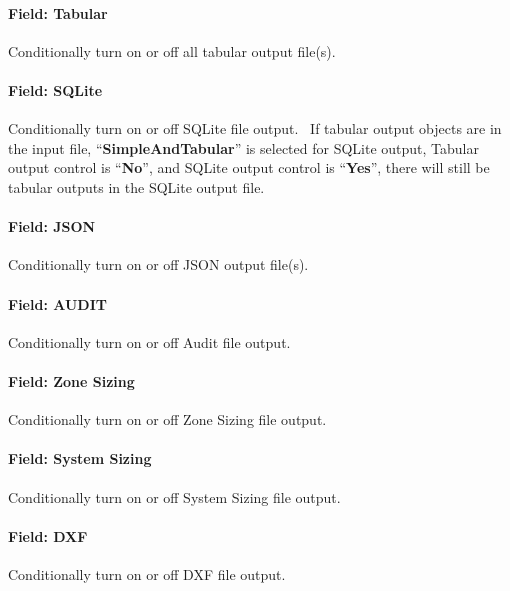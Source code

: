 \paragraph{Field: Tabular}\label{field-tabular}

Conditionally turn on or off all tabular output file(s).

\paragraph{Field: SQLite}\label{field-sqlite}

Conditionally turn on or off SQLite file output.~ If tabular output objects are in the input file, ``\textbf{SimpleAndTabular}'' is selected for SQLite output, Tabular output control is ``\textbf{No}'', and SQLite output control is ``\textbf{Yes}'', there will still be tabular outputs in the SQLite output file.

\paragraph{Field: JSON}\label{field-json}

Conditionally turn on or off JSON output file(s).

\paragraph{Field: AUDIT}\label{field-audit}

Conditionally turn on or off Audit file output.

\paragraph{Field: Zone Sizing}\label{field-zone-sizing}

Conditionally turn on or off Zone Sizing file output.

\paragraph{Field: System Sizing}\label{field-system-sizing}

Conditionally turn on or off System Sizing file output.

\paragraph{Field: DXF}\label{field-dxf}

Conditionally turn on or off DXF file output.

